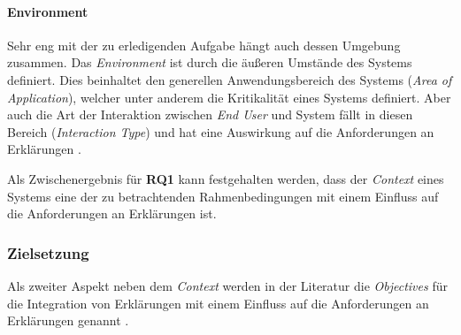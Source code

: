 \paragraph{Environment} Sehr eng mit der zu erledigenden Aufgabe hängt auch dessen Umgebung zusammen. Das \textit{Environment} ist durch die äußeren Umstände des Systems definiert. Dies beinhaltet den generellen Anwendungsbereich des Systems (\textit{Area of Application}), welcher unter anderem die Kri­ti­ka­li­tät eines Systems definiert. Aber auch die Art der Interaktion zwischen \textit{End User} und System fällt in diesen Bereich (\textit{Interaction Type}) und hat eine Auswirkung auf die Anforderungen an Erklärungen \cite{wiegand_id_2020}. 

\bigskip

Als Zwischenergebnis für \textbf{RQ1} kann festgehalten werden, dass der \textit{Context} eines Systems eine der zu betrachtenden Rahmenbedingungen mit einem Einfluss auf die Anforderungen an Erklärungen ist.

\subsubsection{Zielsetzung}
\label{subsec:model_objective}

Als zweiter Aspekt neben dem \textit{Context} werden in der Literatur die \textit{Objectives} für die Integration von Erklärungen mit einem Einfluss auf die Anforderungen an Erklärungen genannt \cite{rosenfeld_explainability_2019, nunes_systematic_2017}. 


